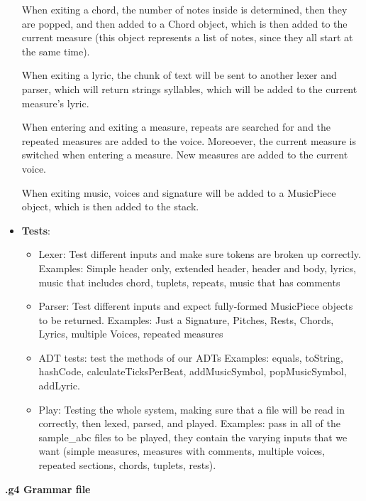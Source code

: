 \documentclass[12pt]{book}
\begin{document}
\begin{itemize}
When exiting a chord, the number of notes inside is determined, then they are popped, and then added to a Chord object, which is then added to the current measure (this object represents a list of notes, since they all start at the same time).

When exiting a lyric, the chunk of text will be sent to another lexer and parser, which will return strings syllables, which will be added to the current measure's lyric.

When entering and exiting a measure, repeats are searched for and the repeated measures are added to the voice. Moreoever, the current measure is switched when entering a measure. New measures are added to the current voice.

When exiting music, voices and signature will be added to a MusicPiece object, which is then added to the stack.

\item {\bf Tests}:
\begin{itemize}
\item Lexer: Test different inputs and make sure tokens are broken up correctly. 
Examples: Simple header only, extended header, header and body, lyrics, music that includes chord, tuplets, repeats, music that has comments
\item Parser: Test different inputs and expect fully-formed MusicPiece objects to be returned. 
Examples: Just a Signature, Pitches, Rests, Chords, Lyrics, multiple Voices, repeated measures
\item ADT tests: test the methods of our ADTs
Examples: equals, toString, hashCode, calculateTicksPerBeat, addMusicSymbol, popMusicSymbol, addLyric.
\item Play: Testing the whole system, making sure that a file will be read in correctly, then lexed, parsed, and played.
Examples: pass in all of the sample\_abc files to be played, they contain the varying inputs that we want (simple measures, measures with comments, multiple voices, repeated sections, chords, tuplets, rests).
\end{itemize}

\end{itemize}

\bigskip
\centerline{{\large \bf .g4 Grammar file }}
\bigskip
\end{document}
